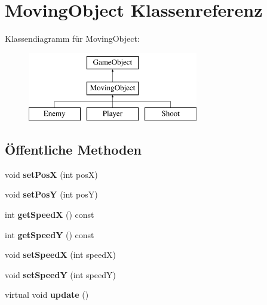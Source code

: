 \hypertarget{classMovingObject}{\section{Moving\-Object Klassenreferenz}
\label{classMovingObject}
}
Klassendiagramm für Moving\-Object\-:\begin{figure}[H]
\begin{center}
\leavevmode
\includegraphics[height=3.000000cm]{classMovingObject}
\end{center}
\end{figure}
\subsection*{Öffentliche Methoden}
\begin{DoxyCompactItemize}
\item 
\hypertarget{classMovingObject_ab0abd688a3a564fde58c1753975ecaf1}{void {\bfseries set\-Pos\-X} (int pos\-X)}\label{classMovingObject_ab0abd688a3a564fde58c1753975ecaf1}

\item 
\hypertarget{classMovingObject_ad2e1227ea79fbc5ea1d6903b3f5140b3}{void {\bfseries set\-Pos\-Y} (int pos\-Y)}\label{classMovingObject_ad2e1227ea79fbc5ea1d6903b3f5140b3}

\item 
\hypertarget{classMovingObject_ac79f660b3543f5afb84205b8715c3282}{int {\bfseries get\-Speed\-X} () const }\label{classMovingObject_ac79f660b3543f5afb84205b8715c3282}

\item 
\hypertarget{classMovingObject_a8ed63e698a611f8a778747719cc63a24}{int {\bfseries get\-Speed\-Y} () const }\label{classMovingObject_a8ed63e698a611f8a778747719cc63a24}

\item 
\hypertarget{classMovingObject_af6721c8115b2cb97b119759a0fb8f60b}{void {\bfseries set\-Speed\-X} (int speed\-X)}\label{classMovingObject_af6721c8115b2cb97b119759a0fb8f60b}

\item 
\hypertarget{classMovingObject_a98dce0d944435d37c7f06f655afa9fea}{void {\bfseries set\-Speed\-Y} (int speed\-Y)}\label{classMovingObject_a98dce0d944435d37c7f06f655afa9fea}

\item 
\hypertarget{classMovingObject_a8614d585f9c38901ad41dd5d35384e1e}{virtual void {\bfseries update} ()}\label{classMovingObject_a8614d585f9c38901ad41dd5d35384e1e}

\end{DoxyCompactItemize}
